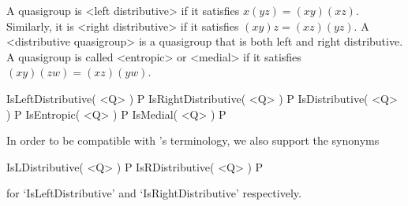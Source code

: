 A quasigroup is <left distributive> if it
satisfies $x(yz)=(xy)(xz)$. Similarly, it is <right distributive> if it satisfies $(xy)z=(xz)(yz)$. A <distributive
quasigroup> is a quasigroup that is both left
and right distributive. A quasigroup is called <entropic> or <medial> if it satisfies
$(xy)(zw)=(xz)(yw)$.

\>IsLeftDistributive( <Q> ) P
\>IsRightDistributive( <Q> ) P
\>IsDistributive( <Q> ) P
\>IsEntropic( <Q> ) P
\>IsMedial( <Q> ) P

In order to be compatible with {\GAP}'s terminology, we also support the synonyms

\>IsLDistributive( <Q> ) P
\>IsRDistributive( <Q> ) P

for `IsLeftDistributive' and `IsRightDistributive' respectively.


